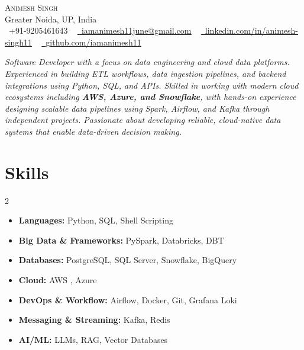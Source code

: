 \documentclass[letterpaper,11pt]{article}
\begin{document}
\begin{center}
    {\Huge \scshape Animesh Singh} \\ \vspace{1pt}
    Greater Noida, UP, India \\ \vspace{1pt}
    \small \raisebox{-0.1\height}\faPhone\ +91-9205461643 ~ \href{mailto:iamanimesh11june@gmail.com}{\raisebox{-0.2\height}\faEnvelope\  \underline{iamanimesh11june@gmail.com}} ~ 
    \href{https://linkedin.com/in/animesh-singh11}{\raisebox{-0.2\height}\faLinkedin\ \underline{linkedin.com/in/animesh-singh11}}  ~
    \href{https://github.com/iamanimesh11}{\raisebox{-0.2\height}\faGithub\ \underline{github.com/iamanimesh11}}
    \vspace{-8pt}
\end{center}

\vspace{3pt}


\textit{\small Software Developer with a focus on data engineering and cloud data platforms. Experienced in building ETL workflows, data ingestion pipelines, and backend integrations using Python, SQL, and APIs. Skilled in working with modern cloud ecosystems including \textbf{AWS, Azure, and Snowflake}, with hands-on experience designing scalable data pipelines using Spark, Airflow, and Kafka through independent projects. Passionate about developing reliable, cloud-native data systems that enable data-driven decision making.}
\vspace{-10pt}


\section{Skills}
\vspace{5pt}

{\footnotesize
\begin{multicols}{2}
\begin{itemize}[leftmargin=*, itemsep=2pt]
  \item \textbf{Languages:} Python, SQL, Shell Scripting
  \item \textbf{Big Data \& Frameworks:} PySpark, Databricks, DBT
  \item \textbf{Databases:} PostgreSQL, SQL Server, Snowflake, BigQuery
  \item \textbf{Cloud:} AWS , Azure
  \item \textbf{DevOps \& Workflow:} Airflow, Docker, Git, Grafana Loki
  \item \textbf{Messaging \& Streaming:} Kafka, Redis
  \item \textbf{AI/ML:} LLMs, RAG, Vector Databases
\end{itemize}
\end{multicols}
}
\end{document}
